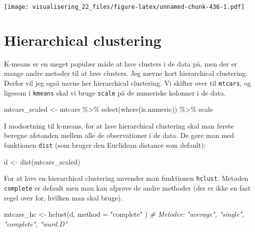 \documentclass[
]{book}
\newenvironment{Shaded}{\begin{snugshade}}{\end{snugshade}}
\newcommand{\AttributeTok}[1]{\textcolor[rgb]{0.77,0.63,0.00}{#1}}
\newcommand{\CommentTok}[1]{\textcolor[rgb]{0.56,0.35,0.01}{\textit{#1}}}
\newcommand{\FunctionTok}[1]{\textcolor[rgb]{0.00,0.00,0.00}{#1}}
\newcommand{\NormalTok}[1]{#1}
\newcommand{\OtherTok}[1]{\textcolor[rgb]{0.56,0.35,0.01}{#1}}
\newcommand{\SpecialCharTok}[1]{\textcolor[rgb]{0.00,0.00,0.00}{#1}}
\newcommand{\StringTok}[1]{\textcolor[rgb]{0.31,0.60,0.02}{#1}}
\begin{document}
\texttt{[image: visualisering\_22\_files/figure-latex/unnamed-chunk-436-1.pdf]}

\hypertarget{hierarchical-clustering}{%
\section{Hierarchical clustering}\label{hierarchical-clustering}}

K-means er en meget populær måde at lave clusters i de data på, men der er mange andre metoder til at lave clusters. Jeg nævne kort hierarchical clustering. Derfor vil jeg også navne her hierarchical clustering. Vi skifter over til \texttt{mtcars}, og ligesom i \texttt{kmeans} skal vi bruge \texttt{scale} på de numeriske kolonner i de data.

\begin{Shaded}
\begin{Highlighting}[]
\NormalTok{mtcars\_scaled }\OtherTok{\textless{}{-}}\NormalTok{ mtcars }\SpecialCharTok{\%\textgreater{}\%} \FunctionTok{select}\NormalTok{(}\FunctionTok{where}\NormalTok{(is.numeric)) }\SpecialCharTok{\%\textgreater{}\%}\NormalTok{ scale}
\end{Highlighting}
\end{Shaded}

I modsætning til k-means, for at lave hierarchical clustering skal man første beregne afstanden mellem alle de observationer i de data. De gøre man med funktionen \texttt{dist} (som bruger den Euclidean distance som default):

\begin{Shaded}
\begin{Highlighting}[]
\NormalTok{d }\OtherTok{\textless{}{-}} \FunctionTok{dist}\NormalTok{(mtcars\_scaled)}
\end{Highlighting}
\end{Shaded}

For at lave en hierarchical clustering anvender man funktionen \texttt{hclust}. Metoden \texttt{complete} er default men man kan afprøve de andre methoder (der er ikke en fast regel over for, hvilken man skal bruge).

\begin{Shaded}
\begin{Highlighting}[]
\NormalTok{mtcars\_hc }\OtherTok{\textless{}{-}} \FunctionTok{hclust}\NormalTok{(d, }\AttributeTok{method =} \StringTok{"complete"}\NormalTok{ )}
\CommentTok{\# Metoder: "average", "single", "complete", "ward.D"}
\end{Highlighting}
\end{Shaded}
\end{document}
